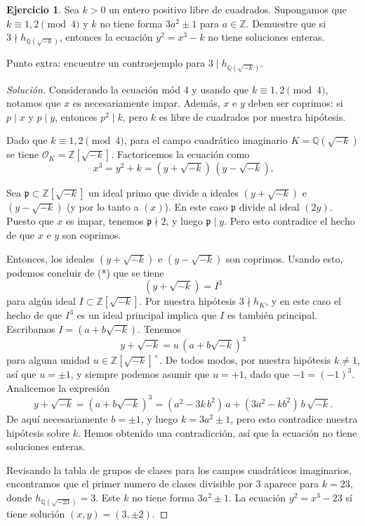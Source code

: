 \documentclass{article}
\theoremstyle{definition}
\newtheorem{ejercicio}{Ejercicio}
\newenvironment{solucion}{\begin{proof}[Solución]}{\end{proof}}
\newcommand{\ZZ}{\mathbb{Z}}
\newcommand{\QQ}{\mathbb{Q}}
\renewcommand{\O}{\mathcal{O}}
\begin{document}
\begin{ejercicio}
  Sea $k > 0$ un entero positivo libre de cuadrados. Supongamos que
  $k \equiv 1,2 \pmod{4}$ y $k$ no tiene forma $3a^2 \pm 1$ para $a \in \ZZ$.
  Demuestre que si $3 \nmid h_{\QQ (\sqrt{-k})}$, entonces la ecuación
  $y^2 = x^3 - k$ no tiene soluciones enteras.

  Punto extra: encuentre un contraejemplo para $3 \mid h_{\QQ (\sqrt{-k})}$.

  \ifdefined\solutions
  \begin{solucion}
    Considerando la ecuación mód $4$ y usando que $k \equiv 1,2 \pmod{4}$,
    notamos que $x$ es necesariamente impar. Además, $x$ e $y$ deben ser
    coprimos: si $p \mid x$ y $p \mid y$, entonces $p^2 \mid k$, pero $k$ es
    libre de cuadrados por nuestra hipótesis.

    Dado que $k \equiv 1,2 \pmod{4}$, para el campo cuadrático imaginario
    $K = \QQ (\sqrt{-k})$ se tiene $\O_K = \ZZ [\sqrt{-k}]$.  Factoricemos la
    ecuación como
    \[ \tag{*} x^3 = y^2 + k = (y + \sqrt{-k})\,(y - \sqrt{-k}). \]

    Sea $\mathfrak{p} \subset \ZZ [\sqrt{-k}]$ un ideal primo que divide a
    ideales $(y + \sqrt{-k})$ e $(y - \sqrt{-k})$ (y por lo tanto a $(x)$).
    En este caso $\mathfrak{p}$ divide al ideal $(2y)$. Puesto que $x$ es impar,
    tenemos $\mathfrak{p} \nmid 2$, y luego $\mathfrak{p} \mid y$. Pero esto
    contradice el hecho de que $x$ e $y$ son coprimos.

    Entonces, los ideales $(y + \sqrt{-k})$ e $(y - \sqrt{-k})$ son
    coprimos. Usando esto, podemos concluir de (*) que se tiene
    \[ (y + \sqrt{-k}) = I^3 \]
    para algún ideal $I \subset \ZZ [\sqrt{-k}]$. Por nuestra hipótesis
    $3 \nmid h_K$, y en este caso el hecho de que $I^3$ es un ideal principal
    implica que $I$ es también principal. Escribamos
    $I = (a + b\sqrt{-k})$. Tenemos
    $$y + \sqrt{-k} = u\,(a + b\sqrt{-k})^3$$
    para alguna unidad $u \in \ZZ [\sqrt{-k}]^\times$. De todos modos, por
    nuestra hipótesis $k \ne 1$, así que $u = \pm 1$, y siempre podemos asumir
    que $u = +1$, dado que $-1 = (-1)^3$. Analicemos la expresión
    \[ y + \sqrt{-k} = (a + b\sqrt{-k})^3 =
      (a^2 - 3k\,b^2)\,a + (3a^2 - kb^2)\,b\,\sqrt{-k}. \]
    De aquí necesariamente $b = \pm 1$, y luego $k = 3a^2 \pm 1$, pero esto
    contradice nuestra hipótesis sobre $k$. Hemos obtenido una contradicción,
    así que la ecuación no tiene soluciones enteras.

    Revisando la tabla de grupos de clases para los campos cuadráticos
    imaginarios, encontramos que el primer numero de clases divisible por $3$
    aparece para $k = 23$, donde $h_{\QQ (\sqrt{-23})} = 3$. Este $k$ no tiene
    forma $3a^2 \pm 1$. La ecuación $y^2 = x^3 - 23$ sí tiene solución
    $(x,y) = (3, \pm 2)$.
  \end{solucion}
  \fi
\end{ejercicio}
\end{document}
